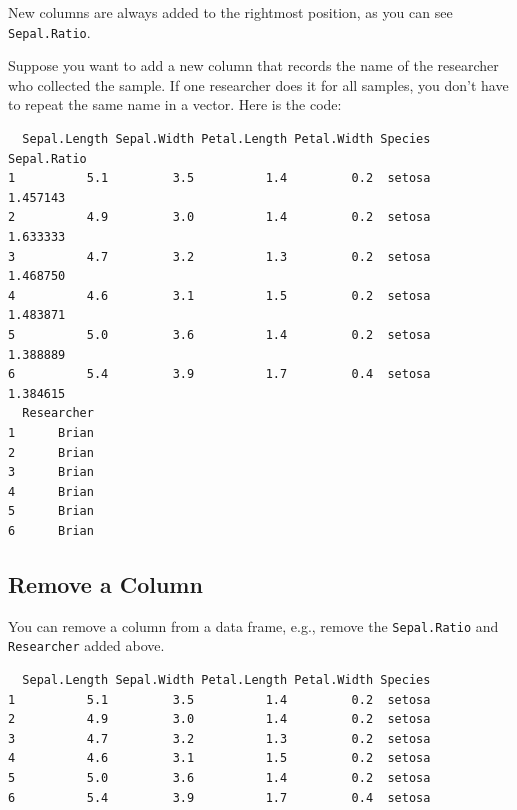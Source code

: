 \documentclass[
  letterpaper,
  DIV=11,
  numbers=noendperiod]{scrreprt}
\newenvironment{Shaded}{\begin{snugshade}}{\end{snugshade}}
\newcommand{\CommentTok}[1]{\textcolor[rgb]{0.37,0.37,0.37}{#1}}
\newcommand{\ConstantTok}[1]{\textcolor[rgb]{0.56,0.35,0.01}{#1}}
\newcommand{\FunctionTok}[1]{\textcolor[rgb]{0.28,0.35,0.67}{#1}}
\newcommand{\NormalTok}[1]{\textcolor[rgb]{0.00,0.23,0.31}{#1}}
\newcommand{\OtherTok}[1]{\textcolor[rgb]{0.00,0.23,0.31}{#1}}
\newcommand{\SpecialCharTok}[1]{\textcolor[rgb]{0.37,0.37,0.37}{#1}}
\newcommand{\StringTok}[1]{\textcolor[rgb]{0.13,0.47,0.30}{#1}}
\begin{document}
New columns are always added to the rightmost position, as you can see
\texttt{Sepal.Ratio}.

Suppose you want to add a new column that records the name of the
researcher who collected the sample. If one researcher does it for all
samples, you don't have to repeat the same name in a vector. Here is the
code:

\begin{Shaded}
\end{Shaded}

\begin{verbatim}
  Sepal.Length Sepal.Width Petal.Length Petal.Width Species Sepal.Ratio
1          5.1         3.5          1.4         0.2  setosa    1.457143
2          4.9         3.0          1.4         0.2  setosa    1.633333
3          4.7         3.2          1.3         0.2  setosa    1.468750
4          4.6         3.1          1.5         0.2  setosa    1.483871
5          5.0         3.6          1.4         0.2  setosa    1.388889
6          5.4         3.9          1.7         0.4  setosa    1.384615
  Researcher
1      Brian
2      Brian
3      Brian
4      Brian
5      Brian
6      Brian
\end{verbatim}

\subsection{Remove a Column}\label{remove-a-column}

You can remove a column from a data frame, e.g., remove the
\texttt{Sepal.Ratio} and \texttt{Researcher} added above.

\begin{Shaded}
\end{Shaded}

\begin{verbatim}
  Sepal.Length Sepal.Width Petal.Length Petal.Width Species
1          5.1         3.5          1.4         0.2  setosa
2          4.9         3.0          1.4         0.2  setosa
3          4.7         3.2          1.3         0.2  setosa
4          4.6         3.1          1.5         0.2  setosa
5          5.0         3.6          1.4         0.2  setosa
6          5.4         3.9          1.7         0.4  setosa
\end{verbatim}
\end{document}
